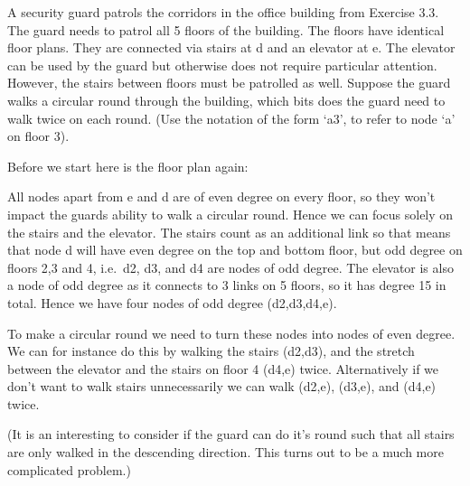 A security guard patrols the corridors in the office building from Exercise 3.3. The guard needs to patrol all 5 floors of the building. The floors have identical floor plans. They are connected via stairs at d and an elevator at e. The elevator can be used by the guard but otherwise does not require particular attention. However, the stairs between floors must be patrolled as well. Suppose the guard walks a circular round through the building, which bits does the guard need to walk twice on each round. (Use the notation of the form `a3', to refer to node `a' on floor 3). 

\solution
Before we start here is the floor plan again:

All nodes apart from e and d are of even degree on every floor, so they won't impact the guards ability to walk a circular round. Hence we can focus solely on the stairs and the elevator. The stairs count as an additional link so that means that node d will have even degree on the top and bottom floor, but odd degree on floors 2,3 and 4, i.e.~d2, d3, and d4 are nodes of odd degree. The elevator is also a node of odd degree as it connects to 3 links on 5 floors, so it has degree 15 in total. Hence we have four nodes of odd degree (d2,d3,d4,e).

To make a circular round we need to turn these nodes into nodes of even degree. We can for instance do this by walking the stairs (d2,d3), and the stretch between the elevator and the stairs on floor 4 (d4,e) twice. Alternatively if we don't want to walk stairs unnecessarily we can walk (d2,e), (d3,e), and (d4,e) twice.

(It is an interesting to consider if the guard can do it's round such that all stairs are only walked in the descending direction. This turns out to be a much more complicated problem.)
